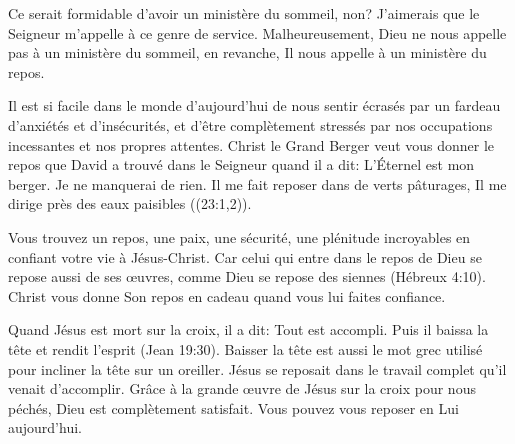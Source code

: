 

Ce serait formidable d'avoir un ministère du sommeil, non? J'aimerais que le Seigneur m'appelle à ce genre de service. Malheureusement, Dieu ne nous appelle pas à un ministère du sommeil, en revanche, Il nous appelle à un ministère du repos.

Il est si facile dans le monde d'aujourd'hui de nous sentir écrasés par un fardeau d'anxiétés et d'insécurités, et d'être complètement stressés par nos occupations incessantes et nos propres attentes. Christ le Grand Berger veut vous donner le repos que David a trouvé dans le Seigneur quand il a dit: \og L’Éternel est mon berger. Je ne manquerai de rien. Il me fait reposer dans de verts pâturages, Il me dirige près des eaux paisibles \fg{} ((23:1,2)).

Vous trouvez un repos, une paix, une sécurité, une plénitude incroyables en confiant votre vie à Jésus-Christ. \og Car celui qui entre dans le repos de Dieu se repose aussi de ses \oe{}uvres, comme Dieu se repose des siennes \fg{} (Hébreux 4:10). Christ vous donne Son repos en cadeau quand vous lui faites confiance.

Quand Jésus est mort sur la croix, il a dit: \og Tout est accompli. Puis il baissa la tête et rendit l’esprit \fg{} (Jean 19:30). \og Baisser la tête \fg{} est aussi le mot grec utilisé pour incliner la tête sur un oreiller. Jésus se reposait dans le travail complet qu'il venait d'accomplir. Grâce à la grande œuvre de Jésus sur la croix pour nous péchés, Dieu est complètement satisfait. Vous pouvez vous reposer en Lui aujourd'hui.

